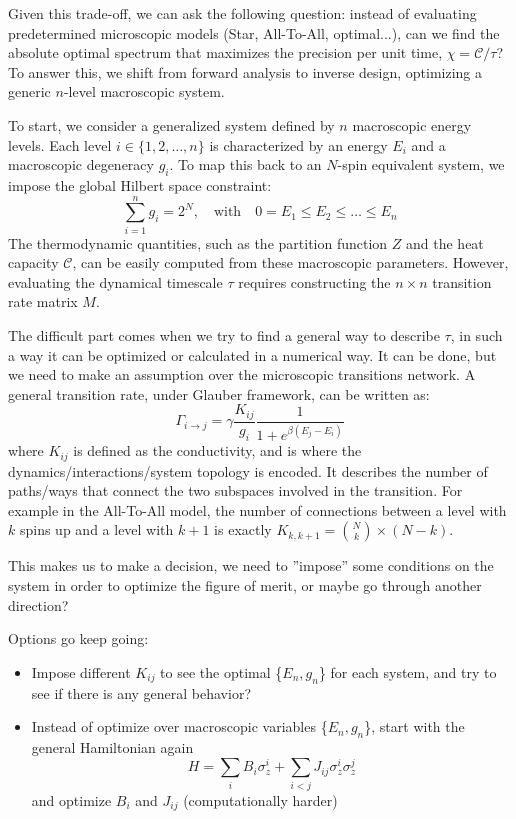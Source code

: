 \documentclass{article}
\begin{document}
Given this trade-off, we can ask the following question: instead of evaluating predetermined microscopic models (Star, All-To-All, optimal...), can we find the absolute optimal spectrum that maximizes the precision per unit time, $\chi = \mathcal{C}/\tau$? To answer this, we shift from forward analysis to inverse design, optimizing a generic $n$-level macroscopic system.

To start, we consider a generalized system defined by $n$ macroscopic energy levels. Each level $i \in \{1, 2, \dots, n\}$ is characterized by an energy $E_i$ and a macroscopic degeneracy $g_i$. To map this back to an $N$-spin equivalent system, we impose the global Hilbert space constraint:
\begin{equation}
    \sum_{i=1}^{n} g_i = 2^N, \quad \text{with} \quad 0 = E_1 \le E_2 \le \dots \le E_n
\end{equation}
The thermodynamic quantities, such as the partition function $Z$ and the heat capacity $\mathcal{C}$, can be easily computed from these macroscopic parameters. However, evaluating the dynamical timescale $\tau$ requires constructing the $n \times n$ transition rate matrix $M$.

The difficult part comes when we try to find a general way to describe $\tau$, in such a way it can be optimized or calculated in a numerical way. It can be done, but we need to make an assumption over the microscopic transitions network. A general transition rate, under Glauber framework, can be written as:
\begin{equation}
    \Gamma_{i \to j} = \gamma\frac{K_{ij}}{g_i} \frac{1}{1 + e^{\beta(E_{j} - E_i)}}
\end{equation}
where $K_{ij}$ is defined as the conductivity, and is where the dynamics/interactions/system topology is encoded. It describes the number of paths/ways that connect the two subspaces involved in the transition. For example in the All-To-All model, the number of connections between a level with $k$ spins up and a level with $k+1$ is exactly $K_{k,k+1}=\binom{N}{k}\times(N-k)$.

This makes us to make a decision, we need to ''impose'' some conditions on the system in order to optimize the figure of merit, or maybe go through another direction?

Options go keep going:
\begin{itemize}
    \item Impose different $K_{ij}$ to see the optimal \{$E_n,g_n$\} for each system, and try to see if there is any general behavior?\\
    \item Instead of optimize over macroscopic variables \{$E_n,g_n$\}, start with the general Hamiltonian again
        \begin{equation}
            H = \sum_{i} B_i \sigma_z^i + \sum_{i < j} J_{ij} \sigma_z^i \sigma_z^j
        \end{equation}
    and optimize $B_i$ and $J_{ij}$ (computationally harder)
\end{itemize}
    
\end{document}
